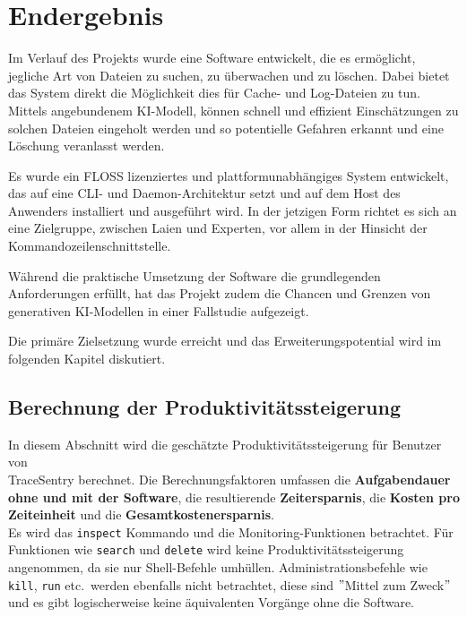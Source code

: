 \documentclass[a4paper,12pt]{report}
\begin{document}
    \clearpage


    \section{Endergebnis}\label{sec:endergebnis}
    Im Verlauf des Projekts wurde eine Software entwickelt, die es ermöglicht, jegliche Art von Dateien zu suchen, zu überwachen und zu löschen.
    Dabei bietet das System direkt die Möglichkeit dies für Cache- und Log-Dateien zu tun.
    Mittels angebundenem KI-Modell, können schnell und effizient Einschätzungen zu solchen Dateien eingeholt werden und so potentielle Gefahren erkannt und eine Löschung veranlasst werden.

    Es wurde ein FLOSS lizenziertes und plattformunabhängiges System entwickelt, das auf eine CLI- und Daemon-Architektur setzt und auf dem Host des Anwenders installiert und ausgeführt wird.
    In der jetzigen Form richtet es sich an eine Zielgruppe, zwischen Laien und Experten, vor allem in der Hinsicht der Kommandozeilenschnittstelle.

    Während die praktische Umsetzung der Software die grundlegenden Anforderungen erfüllt, hat das Projekt zudem die Chancen und Grenzen von generativen KI-Modellen in einer Fallstudie aufgezeigt.

    Die primäre Zielsetzung wurde erreicht und das Erweiterungspotential wird im folgenden Kapitel diskutiert.

    \subsection{Berechnung der Produktivitätssteigerung}\label{subsec:berechnung-der-produktivitatssteigerung}
    In diesem Abschnitt wird die geschätzte Produktivitätssteigerung für Benutzer von \\TraceSentry berechnet.
    Die Berechnungsfaktoren umfassen die \textbf{Aufgabendauer ohne und mit der Software}, die resultierende  \textbf{Zeitersparnis}, die  \textbf{Kosten pro Zeiteinheit} und die  \textbf{Gesamtkostenersparnis}.
    \\Es wird das \texttt{inspect} Kommando und die Monitoring-Funktionen betrachtet.
    Für Funktionen wie \texttt{search} und \texttt{delete} wird keine Produktivitätssteigerung angenommen, da sie nur Shell-Befehle umhüllen.
    Administrationsbefehle wie \texttt{kill}, \texttt{run} etc.\ werden ebenfalls nicht betrachtet, diese sind \("\)Mittel zum Zweck\("\) und es gibt logischerweise keine äquivalenten Vorgänge ohne die Software.
\end{document}
